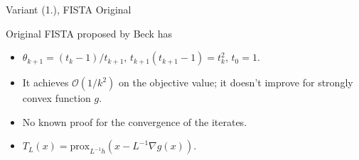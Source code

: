 \documentclass[11pt]{beamer}
\theoremstyle{definition}
\begin{document}
    \begin{frame}{Variant (1.), FISTA Original}
        \begin{algorithm}[H]
            \begin{tiny}
                \begin{algorithmic}[1]
                    \ENDFOR
                \end{algorithmic}
                \caption{Generic FISTA}    
            \end{tiny}
        \end{algorithm}
        Original FISTA proposed by Beck \cite{beck_fast_2009-1} has 
        \begin{itemize}
            \item $\theta_{k + 1} = (t_k - 1)/t_{k + 1}$, $t_{k + 1}(t_{k + 1} - 1) = t_{k}^2$, $t_0 = 1$. 
            \item It achieves $\mathcal O(1/k^2)$ on the objective value; it doesn't improve for strongly convex function $g$. 
            \item No known proof for the convergence of the iterates. 
            \item $T_L(x) = \text{prox}_{L^{-1}h}(x - L^{-1}\nabla g(x))$. 
        \end{itemize}
    \end{frame}
\end{document}
